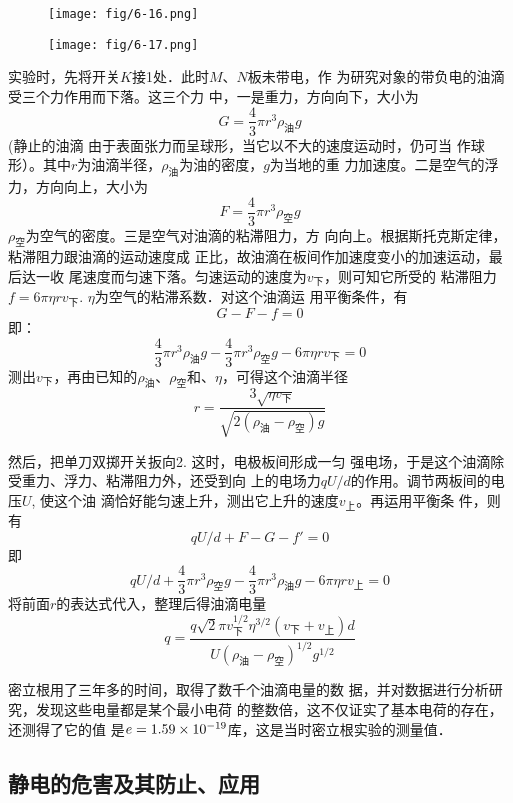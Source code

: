 \begin{figure}[htp]\centering
    \begin{minipage}[t]{0.48\textwidth}
    \centering
    \texttt{[image: fig/6-16.png]}
    \caption{}
    \end{minipage}
    \begin{minipage}[t]{0.48\textwidth}
    \centering
    \texttt{[image: fig/6-17.png]}
    \caption{}
    \end{minipage}
    \end{figure}

实验时，先将开关$K$接1处．此时$M$、$N$板未带电，作
为研究对象的带负电的油滴受三个力作用而下落。这三个力
中，一是重力，方向向下，大小为
\[G=\frac{4}{3}\pi r^3\rho_{\text{油}}g\]
(静止的油滴
由于表面张力而呈球形，当它以不大的速度运动时，仍可当
作球形）。其中$r$为油滴半径，$\rho_{\text{油}}$为油的密度，$g$为当地的重
力加速度。二是空气的浮力，方向向上，大小为
\[F=\frac{4}{3}\pi r^3 \rho_{\text{空}}g\]
$\rho_{\text{空}}$为空气的密度。三是空气对油滴的粘滞阻力，方
向向上。根据斯托克斯定律，粘滞阻力跟油滴的运动速度成
正比，故油滴在板间作加速度变小的加速运动，最后达一收
尾速度而匀速下落。匀速运动的速度为$v_{\text{下}}$，则可知它所受的
粘滞阻力$f=6\pi\eta rv_{\text{下}}$. $\eta$为空气的粘滞系数．对这个油滴运
用平衡条件，有
\[G-F-f=0\]
即：
\[\frac{4}{3}\pi r^3\rho_{\text{油}}g-\frac{4}{3}\pi r^3\rho_{\text{空}}g-6\pi\eta rv_{\text{下}}=0\]
测出$v_{\text{下}}$，再由已知的$\rho_{\text{油}}$、$\rho_{\text{空}}$和、$\eta$，可得这个油滴半径
\[r=\frac{3\sqrt{\eta v_{\text{下}}}}{\sqrt{2(\rho_{\text{油}}-\rho_{\text{空}})g}}\]

然后，把单刀双掷开关扳向2. 这时，电极板间形成一匀
强电场，于是这个油滴除受重力、浮力、粘滞阻力外，还受到向
上的电场力$qU/d$的作用。调节两板间的电压$U$, 使这个油
滴恰好能匀速上升，测出它上升的速度$v_{\text{上}}$。再运用平衡条
件，则有
\[qU/d+F-G-f'=0\]
即
\[qU/d+\frac{4}{3}\pi r^3\rho_{\text{空}}g-\frac{4}{3}\pi r^3\rho_{\text{油}}g-6\pi\eta rv_{\text{上}}=0\]
将前面$r$的表达式代入，整理后得油滴电量
\[q=\frac{q\sqrt{2}\pi v_{\text{下}}^{1/2} \eta^{3/2}(v_{\text{下}}+v_{\text{上}})d}{U(\rho_{\text{油}}-\rho_{\text{空}})^{1/2}g^{1/2}}\]

密立根用了三年多的时间，取得了数千个油滴电量的数
据，并对数据进行分析研究，发现这些电量都是某个最小电荷
的整数倍，这不仅证实了基本电荷的存在，还测得了它的值
是$e=1.59\times10^{-19}$库，这是当时密立根实验的测量值．

\subsection{静电的危害及其防止、应用}

